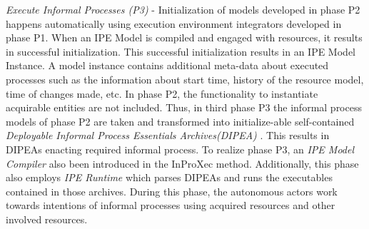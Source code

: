 \textit{Execute Informal Processes (P3)} - Initialization of models developed in phase P2 happens automatically using execution environment integrators developed in phase P1. When an IPE Model is compiled and engaged with resources, it results in successful initialization. This successful initialization results in an IPE Model Instance. A model instance contains additional meta-data about executed processes such as the information about start time, history of the resource model, time of changes made, etc. In phase P2, the functionality to instantiate acquirable entities are not included. Thus, in third phase P3 the informal process models of phase P2 are taken and transformed into initialize-able self-contained \textit{Deployable Informal Process Essentials Archives(DIPEA)} \cite{Sungur2015}. This results in DIPEAs enacting required informal process. To realize phase P3, an \textit{IPE Model Compiler} also been introduced in the InProXec method. Additionally, this phase also employs \textit{IPE Runtime} which parses DIPEAs and runs the executables contained in those archives. During this phase, the autonomous actors work towards intentions of informal processes using acquired resources and other involved resources.  











